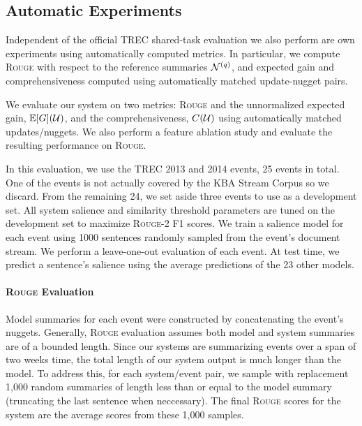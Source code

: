 \subsection{Automatic Experiments}

Independent of the official TREC shared-task evaluation we also perform are
own experiments using automatically computed metrics.  In particular, we
compute \textsc{Rouge} with respect to the reference summaries
$\mathcal{N}^{(q)}$, and expected gain and comprehensiveness computed
using automatically matched update-nugget pairs.


We evaluate our system on two metrics: \textsc{Rouge} and the unnormalized
expected gain, $\mathbb{E}[G](\mathcal{U})$, and the comprehensiveness,
$C(\mathcal{U})$ using automatically matched updates/nuggets.
We also perform a feature ablation study and evaluate the resulting performance
on \textsc{Rouge}.

In this evaluation, we use the TREC 2013 and 2014 events, 25 events in total.
One of the events is not actually covered by the KBA Stream Corpus so we
discard.  From the remaining 24, we set aside three events to use as a
development set. All system salience and similarity threshold parameters are
tuned on the development set to maximize \textsc{Rouge}-2 F1 scores.  We train
a salience model for each event using 1000 sentences randomly sampled from the
event's document stream.  We perform a leave-one-out evaluation of each event.
At test time, we predict a sentence's salience using the average predictions
of the 23 other models.   

\paragraph{\textsc{Rouge} Evaluation}

Model summaries for each event were constructed by concatenating the event's
nuggets. Generally, \textsc{Rouge} evaluation assumes both model and system
summaries are of a bounded length. Since our systems are summarizing events
over a span of two weeks time, the total length of our system output is much
longer than the model. To address this, for each system/event pair, we sample
with replacement 1,000 random summaries of length less than or equal to the
model summary (truncating the last sentence when neccessary). The final
\textsc{Rouge} scores for the system are the average scores from these 1,000
samples.

